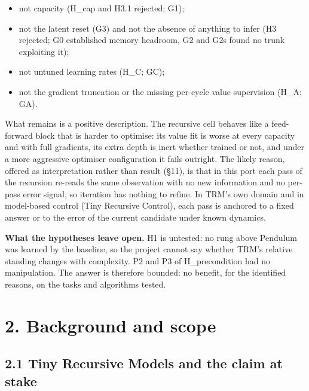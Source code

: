 \documentclass[11pt]{article}
\begin{document}
\begin{itemize}
\item not capacity (H\_cap and H3.1 rejected; G1);
\item not the latent reset (G3) and not the absence of anything to infer (H3 rejected; G0 established memory headroom, G2 and G2s found no trunk exploiting it);
\item not untuned learning rates (H\_C; GC);
\item not the gradient truncation or the missing per-cycle value supervision (H\_A; GA).
\end{itemize}



What remains is a positive description. The recursive cell behaves like a feed-forward block that is harder to optimise: its value fit is worse at every capacity and with full gradients, its extra depth is inert whether trained or not, and under a more aggressive optimiser configuration it fails outright. The likely reason, offered as interpretation rather than result (\S{}11), is that in this port each pass of the recursion re-reads the same observation with no new information and no per-pass error signal, so iteration has nothing to refine. In TRM's own domain and in model-based control (Tiny Recursive Control), each pass is anchored to a fixed answer or to the error of the current candidate under known dynamics.



\textbf{What the hypotheses leave open.} H1 is untested: no rung above Pendulum was learned by the baseline, so the project cannot say whether TRM's relative standing changes with complexity. P2 and P3 of H\_precondition had no manipulation. The answer is therefore bounded: no benefit, for the identified reasons, on the tasks and algorithms tested.





\medskip



\section*{2. Background and scope}



\subsection*{2.1 Tiny Recursive Models and the claim at stake}
\end{document}
